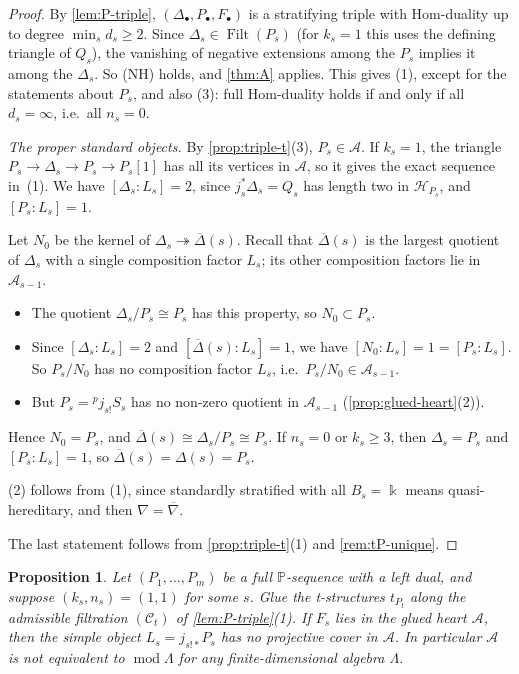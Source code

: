 \documentclass[11pt,reqno]{amsart}
\theoremstyle{plain}
\newtheorem{proposition}[theorem]{Proposition}
\theoremstyle{definition}
\theoremstyle{remark}
\newcommand{\kk}{\Bbbk}
\DeclareMathOperator{\Filt}{Filt}
\newcommand{\modd}{\operatorname{mod}}
\newcommand{\nablabar}{\overline{\nabla}}
\newcommand{\Deltabar}{\overline{\Delta}}
\newcommand{\cA}{\mathcal{A}}
\newcommand{\cH}{\mathcal{H}}
\newcommand{\cC}{\mathcal{C}}
\begin{document}
\begin{proof}
By \cref{lem:P-triple}, $(\Delta_\bullet,P_\bullet,F_\bullet)$ is a stratifying triple with Hom-duality up to degree $\min_sd_s\ge2$. Since $\Delta_s\in\Filt(P_s)$ (for $k_s=1$ this uses the defining triangle of $Q_s$), the vanishing of negative extensions among the $P_s$ implies it among the $\Delta_s$. So (NH) holds, and \cref{thm:A} applies. This gives (1), except for the statements about $P_s$, and also (3): full Hom-duality holds if and only if all $d_s=\infty$, i.e.\ all $n_s=0$.

\emph{The proper standard objects.} By \cref{prop:triple-t}(3), $P_s\in\cA$. If $k_s=1$, the triangle $P_s\to\Delta_s\to P_s\to P_s[1]$ has all its vertices in $\cA$, so it gives the exact sequence in~(1). We have $[\Delta_s:L_s]=2$, since $j_s^*\Delta_s=Q_s$ has length two in $\cH_{P_s}$, and $[P_s:L_s]=1$.

Let $N_0$ be the kernel of $\Delta_s\twoheadrightarrow\Deltabar(s)$. Recall that $\Deltabar(s)$ is the largest quotient of $\Delta_s$ with a single composition factor $L_s$; its other composition factors lie in $\cA_{s-1}$.
\begin{itemize}
\item The quotient $\Delta_s/P_s\cong P_s$ has this property, so $N_0\subset P_s$.
\item Since $[\Delta_s:L_s]=2$ and $[\Deltabar(s):L_s]=1$, we have $[N_0:L_s]=1=[P_s:L_s]$. So $P_s/N_0$ has no composition factor $L_s$, i.e.\ $P_s/N_0\in\cA_{s-1}$.
\item But $P_s={}^p\!j_{s!}S_s$ has no non-zero quotient in $\cA_{s-1}$ (\cref{prop:glued-heart}(2)).
\end{itemize}
Hence $N_0=P_s$, and $\Deltabar(s)\cong\Delta_s/P_s\cong P_s$. If $n_s=0$ or $k_s\ge3$, then $\Delta_s=P_s$ and $[P_s:L_s]=1$, so $\Deltabar(s)=\Delta(s)=P_s$.

(2) follows from (1), since standardly stratified with all $B_s=\kk$ means quasi-hereditary, and then $\nabla=\nablabar$.

The last statement follows from \cref{prop:triple-t}(1) and \cref{rem:tP-unique}.
\end{proof}

\begin{proposition}\label{prop:P11}
Let $(P_1,\dots,P_m)$ be a full $\mathbb{P}$-sequence with a left dual, and suppose $(k_s,n_s)=(1,1)$ for some $s$. Glue the t-structures $t_{P_t}$ along the admissible filtration $(\cC_t)$ of \cref{lem:P-triple}(1). If $F_s$ lies in the glued heart $\cA$, then the simple object $L_s=j_{s!*}P_s$ has no projective cover in $\cA$. In particular $\cA$ is not equivalent to $\modd\Lambda$ for any finite-dimensional algebra $\Lambda$.
\end{proposition}
\end{document}
